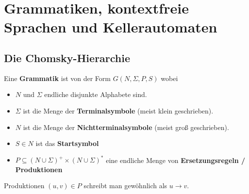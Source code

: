 
\chapter{Grammatiken, kontextfreie Sprachen und Kellerautomaten}

\section{Die Chomsky-Hierarchie}

\begin{definition}\label{def6.2}
	Eine \textbf{Grammatik} ist von der Form $G(N,\Sigma,P,S)$ wobei
	\begin{itemize}
		\item $N$ und $\Sigma$ endliche disjunkte Alphabete sind.
		\item $\Sigma$ ist die Menge der \textbf{Terminalsymbole} (meist klein geschrieben).
		\item $N$ ist die Menge der \textbf{Nichtterminalsymbole} (meist groß geschrieben).
		\item $S\in N$ ist das \textbf{Startsymbol}
		\item $P\subseteq(N\cup\Sigma)^+\times(N\cup\Sigma)^\ast$ eine endliche Menge von \textbf{Ersetzungsregeln / Produktionen}
	\end{itemize}
	Produktionen $(u,v)\in P$ schreibt man gewöhnlich als $u\to v$.
\end{definition}

